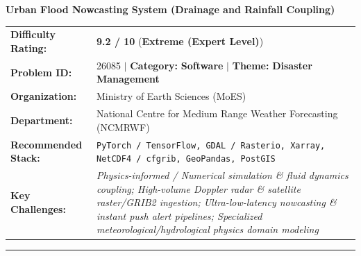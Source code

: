 \documentclass[10pt,a4paper]{article}
\begin{document}
\begin{tcolorbox}[pscard, title={"\textbf{SIH26085} \quad $\vert$ \quad Urban Flood Nowcasting System (Drainage and Rainfall Coupling)}]
\textbf{\large Urban Flood Nowcasting System (Drainage and Rainfall Coupling)}\\[0.25cm]

\begin{tabular}{@{}lp{12.5cm}@{}}
\textbf{Difficulty Rating:} & \textcolor{diffextreme}{\textbf{\Large 9.2 / 10}} \quad (\textbf{Extreme (Expert Level)}) \\
\textbf{Problem ID:} & 26085 \quad $\vert$ \quad \textbf{Category:} \textbf{Software} \quad $\vert$ \quad \textbf{Theme:} \textbf{Disaster Management} \\
\textbf{Organization:} & Ministry of Earth Sciences (MoES) \\
\textbf{Department:} & National Centre for Medium Range Weather Forecasting (NCMRWF) \\
\textbf{Recommended Stack:} & \texttt{PyTorch / TensorFlow, GDAL / Rasterio, Xarray, NetCDF4 / cfgrib, GeoPandas, PostGIS} \\
\textbf{Key Challenges:} & \textit{\small Physics-informed / Numerical simulation \& fluid dynamics coupling; High-volume Doppler radar \& satellite raster/GRIB2 ingestion; Ultra-low-latency nowcasting \& instant push alert pipelines; Specialized meteorological/hydrological physics domain modeling} \\
\end{tabular}

\vspace{0.2cm}
\hrule
\vspace{0.2cm}


\end{tcolorbox}
\end{document}
